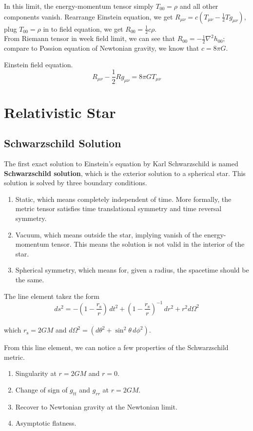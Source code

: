 \documentclass[12pt]{article}
\theoremstyle{mystyle}{\newtheorem{definition}{Definition}[section]}
\theoremstyle{mystyle}{\newtheorem{theorem}[definition]{Theorem}}
\theoremstyle{mystyle}{\newtheorem*{remark}{Remark}}
\theoremstyle{mystyle}{\newtheorem*{example}{Example}}
\theoremstyle{mystyle}{\newtheorem*{examples}{Examples}}
\theoremstyle{cstyle}{\newtheorem*{cthm}{}}
\begin{document}
In this limit, the energy-momentum tensor simply \(T_{00} = \rho\) and all other components vanish.
Rearrange Einstein equation, we get \(R_{\mu\nu} = c\left( T_{\mu\nu} - \frac{1}{2}Tg_{\mu\nu} \right)\),
plug \(T_{00} = \rho\) in to field equation, we get \(R_{00}=\frac{1}{2}c\rho\). \\
From Riemann tensor in week field limit, we can see that \(R_{00}=-\frac{1}{2}\nabla^2 h_{00}\);
compare to Possion equation of Newtonian gravity, we know that \(c = 8\pi G\).
\begin{cthm}
  Einstein field equation.
  \[R_{\mu\nu} -\frac{1}{2}Rg_{\mu\nu} = 8\pi GT_{\mu\nu}\]
\end{cthm}

\section{Relativistic Star}

\subsection{Schwarzschild Solution}

The first exact solution to Einstein's equation by Karl Schwarzschild is named \textbf{Schwarzschild solution},
which is the exterior solution to a spherical star.
This solution is solved by three boundary conditions.

\begin{enumerate}
  \item Static, which means completely independent of time. More formally, the metric tensor satisfies time translational symmetry and time reversal symmetry.
  \item Vacuum, which means outside the star, implying vanish of the energy-momentum tensor. This means the solution is not valid in the interior of the star.
  \item Spherical symmetry, which means for, given a radius, the spacetime should be the same.
\end{enumerate}

\begin{cthm}
  The line element takez the form
  \[ds^2 = -\left(1 - \frac{r_\mathrm{s}}{r} \right)\,dt^2 + \left(1-\frac{r_\mathrm{s}}{r}\right)^{-1} \,dr^2 + r^2 d\Omega^2\]\\
  which \(r_\mathrm{s} = 2GM\) and \(d\Omega^2 = \left(d\theta^2 + \sin^2\theta \, d\phi^2\right)\).
\end{cthm}
From this line element, we can notice a few properties of the Schwarzschild metric.
\begin{enumerate}
  \item Singularity at \(r = 2GM\) and \(r = 0\).
  \item Change of sign of \(g_{tt}\) and \(g_{rr}\) at \(r = 2GM\).
  \item Recover to Newtonian gravity at the Newtonian limit.
  \item Asymptotic flatness.
\end{enumerate}
\end{document}

